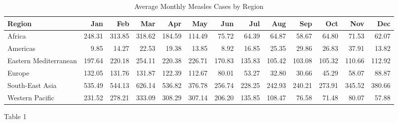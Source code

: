 \documentclass[
  letterpaper,
  DIV=11,
  numbers=noendperiod]{scrartcl}
\begin{document}
\begin{table}
\caption*{
{\fontsize{20}{25}\selectfont  Average Monthly Measles Cases by Region\fontsize{12}{15}\selectfont }
} 
\fontsize{12.0pt}{14.0pt}\selectfont
\begin{tabular*}{\linewidth}{@{\extracolsep{\fill}}lrrrrrrrrrrrr}
\toprule
Region & Jan & Feb & Mar & Apr & May & Jun & Jul & Aug & Sep & Oct & Nov & Dec \\ 
\midrule\addlinespace[2.5pt]
Africa & 248.31 & 313.85 & 318.62 & 184.59 & 114.49 & 75.72 & 64.39 & 64.87 & 58.67 & 64.80 & 71.53 & 62.07 \\ 
Americas & 9.85 & 14.27 & 22.53 & 19.38 & 13.85 & 8.92 & 16.85 & 25.35 & 29.86 & 26.83 & 37.91 & 13.82 \\ 
Eastern Mediterranean & 197.64 & 220.18 & 254.11 & 220.38 & 226.71 & 170.83 & 135.83 & 105.42 & 103.08 & 105.32 & 110.66 & 112.92 \\ 
Europe & 132.05 & 131.76 & 131.87 & 122.39 & 112.67 & 80.01 & 53.27 & 32.80 & 30.66 & 45.29 & 58.07 & 88.87 \\ 
South-East Asia & 535.49 & 544.13 & 626.14 & 536.82 & 376.78 & 256.74 & 228.25 & 242.93 & 240.21 & 273.91 & 345.52 & 380.66 \\ 
Western Pacific & 231.52 & 278.21 & 333.09 & 308.29 & 307.14 & 206.20 & 135.85 & 108.47 & 76.58 & 71.48 & 80.07 & 57.88 \\ 
\bottomrule
\end{tabular*}
\end{table}

Table 1
\end{document}
